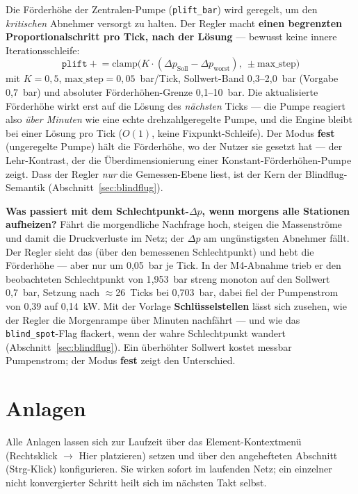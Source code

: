 \documentclass[11pt,a4paper,parskip=half]{scrreprt}
\newcommand{\ui}[1]{\textsf{\bfseries #1}}
\newenvironment{beispiel}[1][Beispiel]
  {\par\medskip{\color{bsp}\hrule height 0.8pt}\nopagebreak\smallskip
   \noindent\textbf{\textsf{\textcolor{bsp}{#1}}}\quad\ignorespaces}
  {\par\nopagebreak\smallskip{\color{bsp}\hrule height 0.8pt}\par\medskip}
\begin{document}
Die Förderhöhe der Zentralen-Pumpe (\texttt{plift\_bar}) wird geregelt, um den
\emph{kritischen} Abnehmer versorgt zu halten. Der Regler macht \textbf{einen
begrenzten Proportionalschritt pro Tick, nach der Lösung} --- bewusst keine
innere Iterationsschleife:
\[
\texttt{plift} \mathrel{+}= \text{clamp}\big(K\cdot(\Delta p_\text{Soll}-\Delta p_\text{worst}),\ \pm\text{max\_step}\big)
\]
mit $K=0{,}5$, $\text{max\_step}=0{,}05$~bar/Tick, Sollwert-Band 0{,}3--2{,}0~bar
(Vorgabe 0{,}7~bar) und absoluter Förderhöhen-Grenze 0{,}1--10~bar. Die
aktualisierte Förderhöhe wirkt erst auf die Lösung des \emph{nächsten} Ticks ---
die Pumpe reagiert also \emph{über Minuten} wie eine echte drehzahlgeregelte
Pumpe, und die Engine bleibt bei einer Lösung pro Tick ($O(1)$, keine
Fixpunkt-Schleife). Der Modus \ui{fest} (\glqq ungeregelte Pumpe\grqq) hält die
Förderhöhe, wo der Nutzer sie gesetzt hat --- der Lehr-Kontrast, der die
Überdimensionierung einer Konstant-Förderhöhen-Pumpe zeigt. Dass der Regler
\emph{nur} die Gemessen-Ebene liest, ist der Kern der Blindflug-Semantik
(Abschnitt~\ref{sec:blindflug}).

\begin{beispiel}[Was passiert mit dem Schlechtpunkt-$\Delta p$, wenn morgens alle Stationen aufheizen?]
Fährt die morgendliche Nachfrage hoch, steigen die Massenströme und damit die
Druckverluste im Netz; der $\Delta p$ am ungünstigsten Abnehmer fällt. Der
Regler sieht das (über den bemessenen Schlechtpunkt) und hebt die Förderhöhe ---
aber nur um 0{,}05~bar je Tick. In der M4-Abnahme trieb er den beobachteten
Schlechtpunkt von 1{,}953~bar streng monoton auf den Sollwert 0{,}7~bar,
Setzung nach $\approx$26~Ticks bei 0{,}703~bar, dabei fiel der Pumpenstrom von
0{,}39 auf 0{,}14~kW. Mit der Vorlage \ui{Schlüsselstellen} lässt sich zusehen,
wie der Regler die Morgenrampe über Minuten nachfährt --- und wie das
\texttt{blind\_spot}-Flag flackert, wenn der wahre Schlechtpunkt wandert
(Abschnitt~\ref{sec:blindflug}). Ein überhöhter Sollwert kostet messbar
Pumpenstrom; der Modus \ui{fest} zeigt den Unterschied.
\end{beispiel}

\chapter{Anlagen}
\label{ch:anlagen}

Alle Anlagen lassen sich zur Laufzeit über das Element-Kontextmenü
(Rechtsklick $\rightarrow$ \glqq Hier platzieren\grqq) setzen und über den
angehefteten Abschnitt (Strg-Klick) konfigurieren. Sie wirken sofort im
laufenden Netz; ein einzelner nicht konvergierter Schritt heilt sich im nächsten
Takt selbst.
\end{document}
